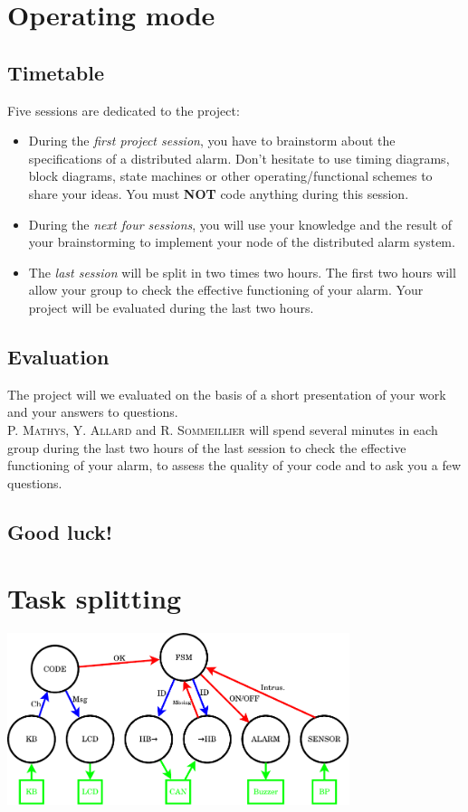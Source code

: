\documentclass[10pt,a4paper]{article}
\theoremstyle{definition}%
\begin{document}
\section{Operating mode}

\subsection{Timetable}
Five sessions are dedicated to the project:
\begin{itemize}
\item During the \emph{first project session}, you have to brainstorm about the specifications of a distributed alarm. Don't hesitate to use timing diagrams, block diagrams, state machines  or other operating/functional schemes to share your ideas. You must \textbf{NOT} code anything during this session.
\item During the \emph{next four sessions}, you will use your knowledge and the result of your brainstorming to implement your node of the distributed alarm system. 
\item The \emph{last session} will be split in two times two hours. The first two hours will allow your group to check the effective functioning of your alarm. Your project will be evaluated during the last two hours.
\end{itemize}


\subsection{Evaluation}
The project will we evaluated on the basis of a short presentation of your work and your answers to questions.\\
\textsc{P. Mathys}, \textsc{Y. Allard} and \textsc{R. Sommeillier} will spend several minutes in each group during the last two hours of the last session to check the effective functioning of your alarm, to assess the quality of your code and to ask you a few questions.

\begin{flushright}
\section*{Good luck!}
\end{flushright}

\section{Task splitting}
 \begin{center}
 \includegraphics[width=10cm]{taches-crop.pdf}
 \end{center}
\end{document}
